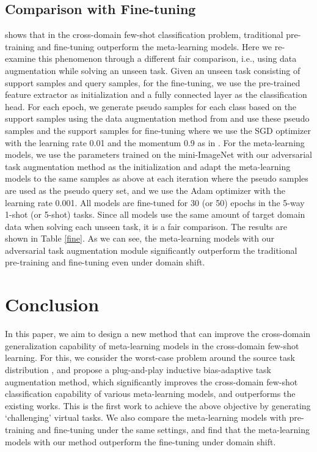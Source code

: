 \documentclass{article}
\begin{document}
\subsection{Comparison with Fine-tuning}\label{fine_tune}
\cite{guo2020broader} shows that in the cross-domain few-shot classification problem, traditional pre-training and fine-tuning outperform the meta-learning models. Here we re-examine this phenomenon through a different fair comparison, i.e., using data augmentation while solving an unseen task. Given an unseen task  consisting of  support samples and  query samples, for the fine-tuning, we use the pre-trained feature extractor as initialization and a fully connected layer as the classification head. For each epoch, we generate  pseudo samples for each class based on the support samples using the data augmentation method from \cite{yeh2020large} and use these  pseudo samples and the support samples for fine-tuning where we use the SGD optimizer with the learning rate 0.01 and the momentum 0.9 as in \cite{guo2020broader}. For the meta-learning models, we use the parameters trained on the mini-ImageNet with our adversarial task augmentation method as the initialization and adapt the meta-learning models to the same  samples as above at each iteration where the  pseudo samples are used as the pseudo query set, and we use the Adam optimizer with the learning rate 0.001. All models are fine-tuned for 30 (or 50) epochs in the 5-way 1-shot (or 5-shot) tasks. Since all models use the same amount of target domain data when solving each unseen task, it is a fair comparison. The results are shown in Table \ref{fine}. As we can see, the meta-learning models with our adversarial task augmentation module significantly outperform the traditional pre-training and fine-tuning even under domain shift.

\section{Conclusion}
In this paper, we aim to design a new method that can improve the cross-domain generalization capability of meta-learning models in the cross-domain few-shot learning. For this, we consider the worst-case problem around the source task distribution , and propose a plug-and-play inductive bias-adaptive task augmentation method, which significantly improves the cross-domain few-shot classification capability of various meta-learning models, and outperforms the existing works. This is the first work to achieve the above objective by generating ‘challenging’ virtual tasks. We also compare the meta-learning models with pre-training and fine-tuning under the same settings, and find that the meta-learning models with our method outperform the fine-tuning under domain shift.



\end{document}
